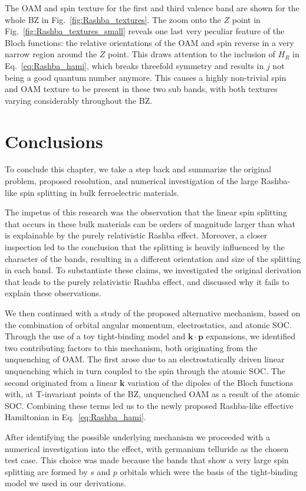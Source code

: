 The OAM and spin texture for the first and third valence band are shown for the whole BZ in Fig.~\ref{fig:Rashba_textures}.
The zoom onto the $Z$ point in Fig.~\ref{fig:Rashba_textures_small} reveals one last very peculiar feature of the Bloch functions: the relative orientations of the OAM and spin reverse in a very narrow region around the $Z$ point.
This draws attention to the inclusion of $H_R$ in Eq.~\eqref{eq:Rashba_hami}, which breaks threefold symmetry and results in $j$ not being a good quantum number anymore. This causes a highly non-trivial spin and OAM texture to be present in these two sub bands, with both textures varying considerably throughout the BZ. 
\section{Conclusions}
To conclude this chapter, we take a step back and summarize the original problem, proposed resolution, and numerical investigation of the large Rashba-like spin splitting in bulk ferroelectric materials.
    
The impetus of this research was the observation that the linear spin splitting that occurs in these bulk materials can be orders of magnitude larger than what is explainable by the purely relativistic Rashba effect.
Moreover, a closer inspection led to the conclusion that the splitting is heavily influenced by the character of the bands, resulting in a different orientation and size of the splitting in each band.
To substantiate these claims, we investigated the original derivation that leads to the purely relativistic Rashba effect, and discussed why it fails to explain these observations.
    
We then continued with a study of the proposed alternative mechanism, based on the combination of orbital angular momentum, electrostatics, and atomic SOC.
Through the use of a toy tight-binding model and $\bm k \cdot \bm p$ expansions, we identified two contributing factors to this mechanism, both originating from the unquenching of OAM.
The first arose due to an electrostatically driven linear unquenching which in turn coupled to the spin through the atomic SOC.
The second originated from a linear $\bm k$ variation of the dipoles of the Bloch functions with, at T-invariant points of the BZ, unquenched OAM as a result of the atomic SOC.
Combining these terms led us to the newly proposed Rashba-like effective Hamiltonian in Eq.~\eqref{eq:Rashba_hami}.
    
After identifying the possible underlying mechanism we proceeded with a numerical investigation into the effect, with germanium telluride as the chosen test case.
This choice was made because the bands that show a very large spin splitting are formed by $s$ and $p$ orbitals which were the basis of the tight-binding model we used in our derivations.
    
